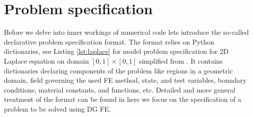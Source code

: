 \section{Problem specification}
Before we delve into inner workings of \sfepy{} numerical code lets 
introduce the so-called declarative problem specification format. The format relies on 
Python dictionaries, see Listing \ref{lst:laplace} for model problem specification for 2D 
Laplace equation on domain $[0, 1] \times [0, 1]$ simplified from . It 
contains dictionaries declaring components of the problem like regions in a geometric 
domain, field governing the used FE method, state, and test variables, boundary 
conditions, material constants, and functions, etc. Detailed and more general treatment 
of the format can be found in \cite{Cimrman_Lukes_Rohan_2019} here we focus on the 
specification of a problem to be solved using DG FE.

